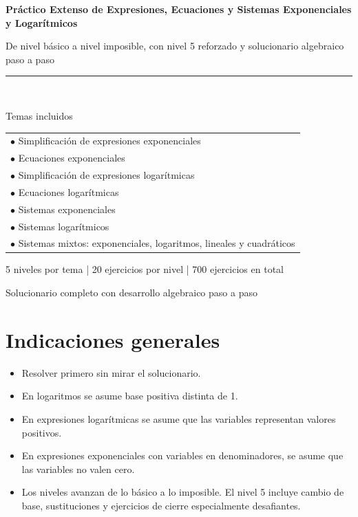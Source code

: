 \documentclass[12pt,a4paper]{article}
\begin{document}
\begin{titlepage}
    \centering
    \vspace*{2cm}
    {\Huge\bfseries Práctico Extenso de Expresiones, Ecuaciones y Sistemas Exponenciales y Logarítmicos\par}
    \vspace{0.8cm}
    {\Large De nivel básico a nivel imposible, con nivel 5 reforzado y solucionario algebraico paso a paso\par}
    \vspace{1.5cm}
    \rule{0.85\textwidth}{0.6pt}\\[0.5cm]
    {\large Temas incluidos\par}
    \vspace{0.4cm}
    \begin{tabular}{>{\raggedright\arraybackslash}p{}}
    $\bullet$ Simplificación de expresiones exponenciales\\
    $\bullet$ Ecuaciones exponenciales\\
    $\bullet$ Simplificación de expresiones logarítmicas\\
    $\bullet$ Ecuaciones logarítmicas\\
    $\bullet$ Sistemas exponenciales\\
    $\bullet$ Sistemas logarítmicos\\
    $\bullet$ Sistemas mixtos: exponenciales, logaritmos, lineales y cuadráticos
    \end{tabular}
    \vfill
    {\large 5 niveles por tema | 20 ejercicios por nivel | 700 ejercicios en total\par}
    \vspace{0.4cm}
    {\large Solucionario completo con desarrollo algebraico paso a paso\par}
    \vspace*{1cm}
\end{titlepage}
\tableofcontents
\newpage
\section*{Indicaciones generales}


\begin{itemize}
\item Resolver primero sin mirar el solucionario.
\item En logaritmos se asume base positiva distinta de 1.
\item En expresiones logarítmicas se asume que las variables representan valores positivos.
\item En expresiones exponenciales con variables en denominadores, se asume que las variables no valen cero.
\item Los niveles avanzan de lo básico a lo imposible. El nivel 5 incluye cambio de base, sustituciones y ejercicios de cierre especialmente desafiantes.
\end{itemize}
\newpage
\end{document}
